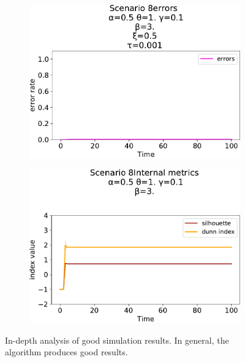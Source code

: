\begin{figure}[!ht]
\begin{subfigure}[b]{0.32\textwidth}
    \includegraphics[width=\textwidth]{papers/swarm-intelligence2021/img/simulations/failScenario_0_08_α-0.5_θ-1._γ-0.1_β-3._ω-0._ζ-0._ξ-0.5_τ-0.001}
  \end{subfigure}
  \hfill
  \begin{subfigure}[b]{0.32\textwidth}
    \centering
    \includegraphics[width=\textwidth]{papers/swarm-intelligence2021/img/simulations/failScenario_0_0910_α-0.5_θ-1._γ-0.1_β-3._ω-0._ζ-0._ξ-0.5_τ-0.001}
  \end{subfigure}
  \caption{In-depth analysis of good simulation results. 
  In general, the algorithm produces good results. 
  }
  
  \label{fig:good-simulation-results}
\end{figure}
